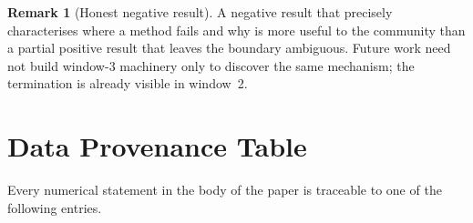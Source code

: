 \documentclass[12pt,a4paper]{amsart}
\theoremstyle{plain}
\theoremstyle{definition}
\newtheorem{remark}[theorem]{Remark}
\begin{document}
\begin{remark}[Honest negative result]
A negative result that precisely characterises where a method fails and why is
more useful to the community than a partial positive result that leaves the
boundary ambiguous.  Future work need not build window-3 machinery only to
discover the same mechanism; the termination is already visible in window~2.
\end{remark}

\appendix
\section{Data Provenance Table}
\label{app:data}

Every numerical statement in the body of the paper is traceable to one of the
following entries.
\end{document}
